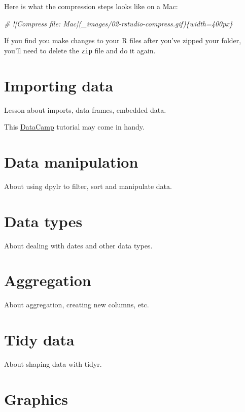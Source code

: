 \documentclass[]{book}
\newenvironment{Shaded}{\begin{snugshade}}{\end{snugshade}}
\newcommand{\CommentTok}[1]{\textcolor[rgb]{0.56,0.35,0.01}{\textit{#1}}}
\begin{document}
Here is what the compression steps looks like on a Mac:

\begin{Shaded}
\begin{Highlighting}[]
\CommentTok{# ![Compress file: Mac](_images/02-rstudio-compress.gif)\{width=400px\}}
\end{Highlighting}
\end{Shaded}

If you find you make changes to your R files after you've zipped your
folder, you'll need to delete the \texttt{zip} file and do it again.

\chapter{Importing data}\label{import}

Lesson about imports, data frames, embedded data.

This
\href{https://www.datacamp.com/community/tutorials/r-data-import-tutorial\#spss}{DataCamp}
tutorial may come in handy.

\chapter{Data manipulation}\label{manipulation}

About using dpylr to filter, sort and manipulate data.

\chapter{Data types}\label{datatypes}

About dealing with dates and other data types.

\chapter{Aggregation}\label{aggregation}

About aggregation, creating new columns, etc.

\chapter{Tidy data}\label{tidy}

About shaping data with tidyr.

\chapter{Graphics}\label{graphics}
\end{document}
